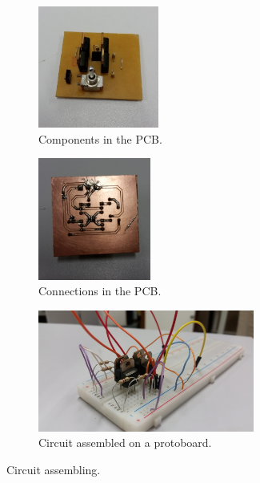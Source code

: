 \begin{figure}
\centering

\begin{subfigure}{.45\columnwidth}
\includegraphics[height=4cm]{img/compontentes4.jpg}
\caption{Components in the PCB.}
\label{fig:pcb_top}
\end{subfigure}
\begin{subfigure}{.45\columnwidth}
\centering
\includegraphics[height=4cm]{img/solda_ja_saiu_da_jaula.jpg}
\caption{Connections in the PCB.}
\label{fig:pcb_bot}
\end{subfigure}
\begin{subfigure}{\columnwidth}
\centering
\includegraphics[height=4cm]{img/h_bridge_proto_close.jpg}
\caption{Circuit assembled on a protoboard.}
\label{fig:proto_h}
\end{subfigure}
\caption{Circuit assembling.}
\end{figure}

